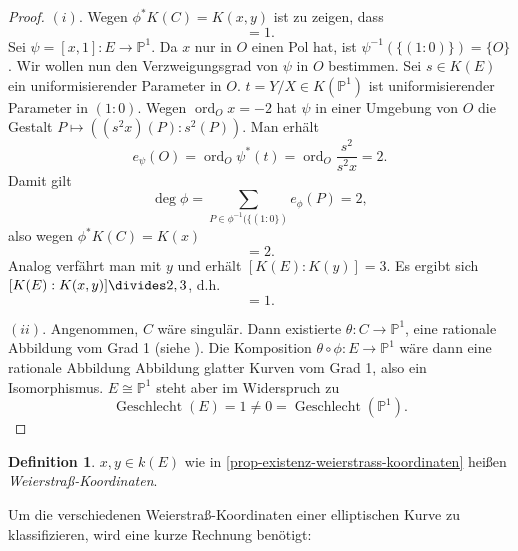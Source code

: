 \documentclass{amsart}
\theoremstyle{plain}
\theoremstyle{definition}
\newtheorem{definition}[subsection]{Definition}
\newcommand{\projspace}{\mathds{P}}
\newcommand{\genus}{\operatorname{Geschlecht}}
\newcommand{\ord}{\operatorname{ord}}
\begin{document}
\begin{proof}
	$(i)$.
	Wegen $\phi^{\ast} K(C) = K(x, y)$ ist zu zeigen, dass
	\begin{equation*}
		[K(E) : K(x, y)] = 1.
	\end{equation*}
	Sei $\psi = [x, 1] \colon E \rightarrow \projspace^1$.
	Da $x$ nur in $O$ einen Pol hat, ist $\psi^{-1}(\{(1 : 0)\}) = \{ O \}$.
	Wir wollen nun den Verzweigungsgrad von $\psi$ in $O$ bestimmen.
	Sei $s \in K(E)$ ein uniformisierender Parameter in $O$.
	$t = Y/X \in K(\projspace^1)$ ist uniformisierender Parameter in $(1 : 0)$.
	Wegen $\ord_O x = -2$ hat $\psi$ in einer Umgebung von $O$ die Gestalt $P \mapsto ((s^2x)(P) : s^2(P))$.
	Man erhält
	\begin{equation*}
		e_{\psi}(O) = \ord_O\psi^{\ast}(t) = \ord_O \frac{s^2}{s^2x} = 2.
	\end{equation*}
	Damit gilt
	\begin{equation*}
		\deg \phi = \sum_{P \in \phi^{-1}(\{(1 : 0\})} e_{\phi}(P) = 2,
	\end{equation*}
	also wegen $\phi^{\ast}K(C) = K(x)$
	\begin{equation*}
		[K(E) : K(x)] = 2.
	\end{equation*}
	Analog verfährt man mit $y$ und erhält $[K(E) : K(y)] = 3$.
	Es ergibt sich $[K(E) : K(x, y)] \divides 2, 3$, d.h.
	\begin{equation*}
		[K(E) : K(x, y)] = 1.
	\end{equation*}
	
	$(ii)$.
	Angenommen, $C$ wäre singulär.
	Dann existierte $\theta : C \rightarrow \projspace^1$, eine rationale Abbildung vom Grad 1 (siehe \cite[III. 1.6]{silverman}).
	Die Komposition $\theta \circ \phi : E \rightarrow \projspace^1$ wäre dann eine rationale Abbildung Abbildung glatter Kurven vom Grad 1, also ein Isomorphismus.
	$E \cong \projspace^1$ steht aber im Widerspruch zu
	\begin{equation*}
		\genus(E) = 1 \neq 0 = \genus(\projspace^1).
	\end{equation*}
\end{proof}

\begin{definition}
	$x, y \in k(E)$ wie in \ref{prop-existenz-weierstrass-koordinaten} heißen {\it Weierstraß-Koordinaten}.
\end{definition}

Um die verschiedenen Weierstraß-Koordinaten einer elliptischen Kurve zu klassifizieren, wird eine kurze Rechnung benötigt:
\end{document}
